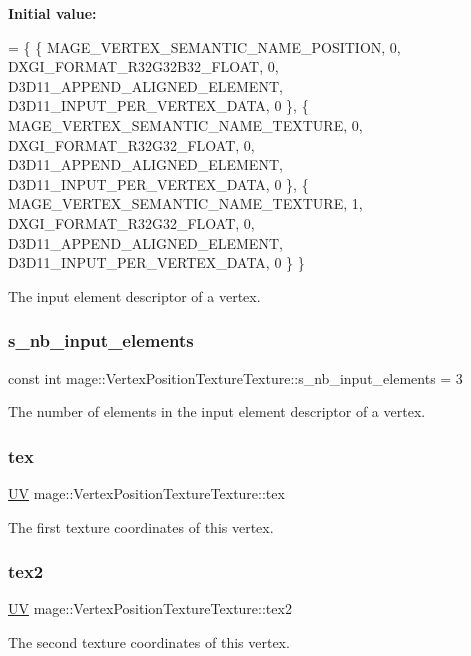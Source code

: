 {\bfseries Initial value\+:}
\begin{DoxyCode}
= \{
        \{ MAGE\_VERTEX\_SEMANTIC\_NAME\_POSITION, 0, DXGI\_FORMAT\_R32G32B32\_FLOAT,    0, 
      D3D11\_APPEND\_ALIGNED\_ELEMENT, D3D11\_INPUT\_PER\_VERTEX\_DATA, 0 \},
        \{ MAGE\_VERTEX\_SEMANTIC\_NAME\_TEXTURE,  0, DXGI\_FORMAT\_R32G32\_FLOAT,       0, 
      D3D11\_APPEND\_ALIGNED\_ELEMENT, D3D11\_INPUT\_PER\_VERTEX\_DATA, 0 \},
        \{ MAGE\_VERTEX\_SEMANTIC\_NAME\_TEXTURE,  1, DXGI\_FORMAT\_R32G32\_FLOAT,       0, 
      D3D11\_APPEND\_ALIGNED\_ELEMENT, D3D11\_INPUT\_PER\_VERTEX\_DATA, 0 \}
    \}
\end{DoxyCode}
The input element descriptor of a vertex. \hypertarget{structmage_1_1_vertex_position_texture_texture_a587a9f30fb21d84ff8c3291c4d2ea9ac}{}\label{structmage_1_1_vertex_position_texture_texture_a587a9f30fb21d84ff8c3291c4d2ea9ac} 
\subsubsection{\texorpdfstring{s\+\_\+nb\+\_\+input\+\_\+elements}{s\_nb\_input\_elements}}
{\footnotesize\ttfamily const int mage\+::\+Vertex\+Position\+Texture\+Texture\+::s\+\_\+nb\+\_\+input\+\_\+elements = 3\hspace{0.3cm}{\ttfamily [static]}}

The number of elements in the input element descriptor of a vertex. \hypertarget{structmage_1_1_vertex_position_texture_texture_ae47656414d503a2c96c88fa6d485cccf}{}\label{structmage_1_1_vertex_position_texture_texture_ae47656414d503a2c96c88fa6d485cccf} 
\subsubsection{\texorpdfstring{tex}{tex}}
{\footnotesize\ttfamily \hyperlink{structmage_1_1_u_v}{UV} mage\+::\+Vertex\+Position\+Texture\+Texture\+::tex}

The first texture coordinates of this vertex. \hypertarget{structmage_1_1_vertex_position_texture_texture_a5a41669f18385d932c1490ff20c80bed}{}\label{structmage_1_1_vertex_position_texture_texture_a5a41669f18385d932c1490ff20c80bed} 
\subsubsection{\texorpdfstring{tex2}{tex2}}
{\footnotesize\ttfamily \hyperlink{structmage_1_1_u_v}{UV} mage\+::\+Vertex\+Position\+Texture\+Texture\+::tex2}

The second texture coordinates of this vertex. 